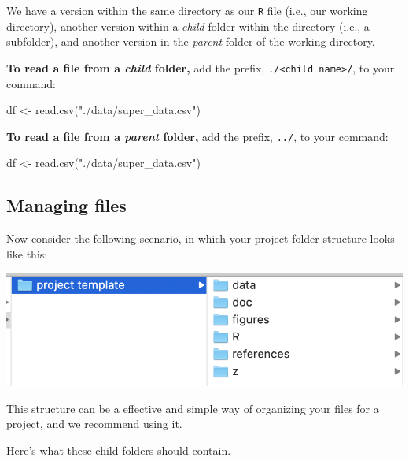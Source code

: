 \documentclass[
]{book}
\newenvironment{Shaded}{\begin{snugshade}}{\end{snugshade}}
\newcommand{\FunctionTok}[1]{\textcolor[rgb]{0.00,0.00,0.00}{#1}}
\newcommand{\NormalTok}[1]{#1}
\newcommand{\OtherTok}[1]{\textcolor[rgb]{0.56,0.35,0.01}{#1}}
\newcommand{\StringTok}[1]{\textcolor[rgb]{0.31,0.60,0.02}{#1}}
\begin{document}
We have a version within the same directory as our \texttt{R} file (i.e., our working directory), another version within a \emph{child} folder within the directory (i.e., a subfolder), and another version in the \emph{parent} folder of the working directory.

\textbf{To read a file from a \emph{child} folder,} add the prefix, \texttt{./\textless{}child\ name\textgreater{}/}, to your command:

\begin{Shaded}
\begin{Highlighting}[]
\NormalTok{df }\OtherTok{\textless{}{-}} \FunctionTok{read.csv}\NormalTok{(}\StringTok{"./data/super\_data.csv"}\NormalTok{)}
\end{Highlighting}
\end{Shaded}

\textbf{To read a file from a \emph{parent} folder,} add the prefix, \texttt{../}, to your command:

\begin{Shaded}
\begin{Highlighting}[]
\NormalTok{df }\OtherTok{\textless{}{-}} \FunctionTok{read.csv}\NormalTok{(}\StringTok{"./data/super\_data.csv"}\NormalTok{)}
\end{Highlighting}
\end{Shaded}

\hypertarget{managing-files}{%
\subsection*{Managing files}\label{managing-files}}

Now consider the following scenario, in which your project folder structure looks like this:

\includegraphics{img/project_template.png}

This structure can be a effective and simple way of organizing your files for a project, and we recommend using it.

Here's what these child folders should contain.
\end{document}
